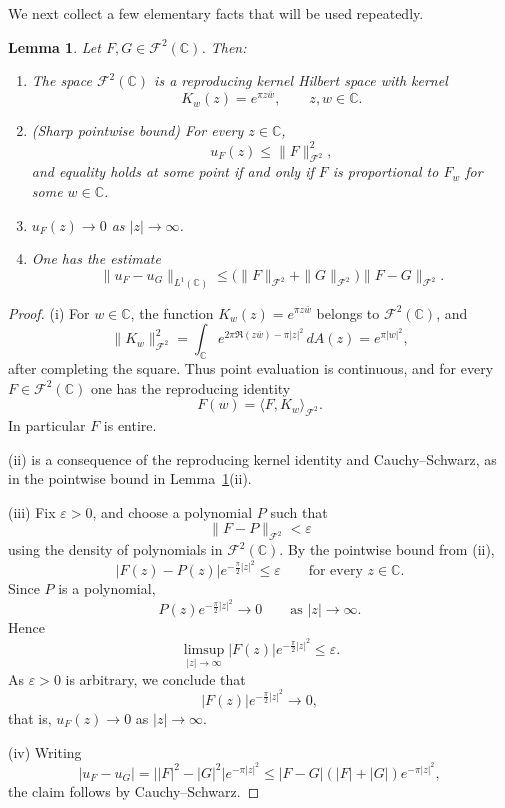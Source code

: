 \documentclass[a4paper,11pt,reqno]{amsart}
\numberwithin{equation}{section}
\theoremstyle{plain} %
\newtheorem{lemma}{Lemma}[section]
\theoremstyle{definition} %
\theoremstyle{remark}
\newcommand{\C}{\mathbb{C}}
\begin{document}
We next collect a few elementary facts that will be used repeatedly.

\begin{lemma}\label{lem:Fock-basic}
Let $F,G \in \mathcal{F}^2(\mathbb{C})$. Then:
\begin{enumerate}
\item[(i)] The space $\mathcal{F}^2(\mathbb{C})$ is a reproducing kernel Hilbert space with kernel
\[
K_w(z) = e^{\pi z \overline{w}}, \qquad z,w \in \mathbb{C}.
\]

\item[(ii)] (Sharp pointwise bound) For every $z \in \mathbb{C}$,
\[
\label{eq:pointwise}
u_F(z) \le \|F\|_{\mathcal{F}^2}^2,
\]
and equality holds at some point if and only if $F$ is proportional to $F_w$
for some $w \in \mathbb{C}$.

\item[(iii)] $u_F(z) \to 0$ as $|z| \to \infty$.

\item[(iv)] One has the estimate
\[
\|u_F - u_G\|_{L^1(\mathbb{C})}
\le \big( \|F\|_{\mathcal{F}^2} + \|G\|_{\mathcal{F}^2} \big)
\|F - G\|_{\mathcal{F}^2}.
\]
\end{enumerate}
\end{lemma}

\begin{proof}
(i) For \(w\in \C\), the function \(K_w(z)=e^{\pi z\overline w}\) belongs to
\(\mathcal F^2(\C)\), and
\[
\|K_w\|_{\mathcal F^2}^2
=
\int_{\C} e^{2\pi \Re(z\overline w)-\pi |z|^2}\,dA(z)
=
e^{\pi |w|^2},
\]
after completing the square. Thus point evaluation is continuous, and for every
\(F\in \mathcal F^2(\C)\) one has the reproducing identity
\[
F(w)=\langle F,K_w\rangle_{\mathcal F^2}.
\]
In particular \(F\) is entire.

(ii) is a consequence of the reproducing kernel identity and Cauchy--Schwarz,
as in the pointwise bound in Lemma~\ref{lem:Fock-basic}(ii).

(iii) Fix \(\varepsilon>0\), and choose a polynomial \(P\) such that
\[
\|F-P\|_{\mathcal F^2}<\varepsilon
\]
using the density of polynomials in \(\mathcal F^2(\C)\). By the pointwise bound from (ii),
\[
|F(z)-P(z)|e^{-\frac{\pi}{2}|z|^2}\le \varepsilon
\qquad\text{for every }z\in \C.
\]
Since \(P\) is a polynomial,
\[
P(z)e^{-\frac{\pi}{2}|z|^2}\to 0
\qquad\text{as }|z|\to\infty.
\]
Hence
\[
\limsup_{|z|\to\infty}|F(z)|e^{-\frac{\pi}{2}|z|^2}\le \varepsilon.
\]
As \(\varepsilon>0\) is arbitrary, we conclude that
\[
|F(z)|e^{-\frac{\pi}{2}|z|^2}\to 0,
\]
that is, \(u_F(z)\to 0\) as \(|z|\to\infty\).

(iv) Writing
\[
|u_F - u_G|
= \big||F|^2 - |G|^2\big| e^{-\pi|z|^2}
\le |F-G|(|F|+|G|) e^{-\pi|z|^2},
\]
the claim follows by Cauchy--Schwarz.
\end{proof}
\end{document}
